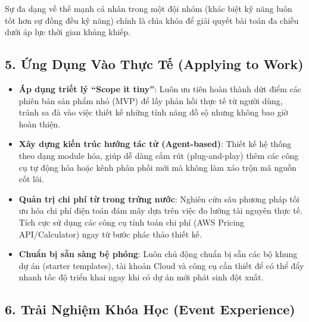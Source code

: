 Sự đa dạng về thế mạnh cá nhân trong một đội nhóm (khác biệt kỹ năng
luôn tốt hơn sự đồng đều kỹ năng) chính là chìa khóa để giải quyết bài
toán đa chiều dưới áp lực thời gian khủng khiếp.

\hypertarget{ux1ee9ng-dux1ee5ng-vuxe0o-thux1ef1c-tux1ebf-applying-to-work}{%
\subsection{5. Ứng Dụng Vào Thực Tế (Applying to
Work)}}

\begin{itemize}
\tightlist
\item
  \textbf{Áp dụng triết lý ``Scope it tiny''}: Luôn ưu tiên hoàn thành
  dứt điểm các phiên bản sản phẩm nhỏ (MVP) để lấy phản hồi thực tế từ
  người dùng, tránh sa đà vào việc thiết kế những tính năng đồ sộ nhưng
  không bao giờ hoàn thiện.
\item
  \textbf{Xây dựng kiến trúc hướng tác tử (Agent-based)}: Thiết kế hệ
  thống theo dạng module hóa, giúp dễ dàng cắm rút (plug-and-play) thêm
  các công cụ tự động hóa hoặc kênh phân phối mới mà không làm xáo trộn
  mã nguồn cốt lõi.
\item
  \textbf{Quản trị chi phí từ trong trứng nước}: Nghiên cứu sâu phương
  pháp tối ưu hóa chi phí điện toán đám mây dựa trên việc đo lường tài
  nguyên thực tế. Tích cực sử dụng các công cụ tính toán chi phí (AWS
  Pricing API/Calculator) ngay từ bước phác thảo thiết kế.
\item
  \textbf{Chuẩn bị sẵn sàng bệ phóng}: Luôn chủ động chuẩn bị sẵn các bộ
  khung dự án (starter templates), tài khoản Cloud và công cụ cần thiết
  để có thể đẩy nhanh tốc độ triển khai ngay khi có dự án mới phát sinh
  đột xuất.
\end{itemize}

\hypertarget{trux1ea3i-nghiux1ec7m-khuxf3a-hux1ecdc-event-experience}{%
\subsection{6. Trải Nghiệm Khóa Học (Event
Experience)}}


